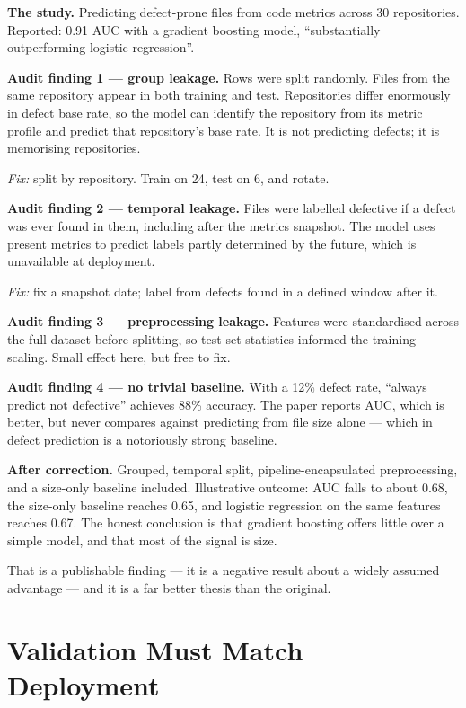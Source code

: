 \begin{worked}
\textbf{The study.} Predicting defect-prone files from code metrics across 30
repositories. Reported: 0.91 AUC with a gradient boosting model, ``substantially
outperforming logistic regression''.

\medskip
\textbf{Audit finding 1 --- group leakage.} Rows were split randomly. Files from
the same repository appear in both training and test. Repositories differ
enormously in defect base rate, so the model can identify the repository from
its metric profile and predict that repository's base rate. It is not
predicting defects; it is memorising repositories.

\emph{Fix:} split by repository. Train on 24, test on 6, and rotate.

\medskip
\textbf{Audit finding 2 --- temporal leakage.} Files were labelled defective if
a defect was ever found in them, including after the metrics snapshot. The
model uses present metrics to predict labels partly determined by the future,
which is unavailable at deployment.

\emph{Fix:} fix a snapshot date; label from defects found in a defined window
after it.

\medskip
\textbf{Audit finding 3 --- preprocessing leakage.} Features were standardised
across the full dataset before splitting, so test-set statistics informed the
training scaling. Small effect here, but free to fix.

\medskip
\textbf{Audit finding 4 --- no trivial baseline.} With a 12\% defect rate,
``always predict not defective'' achieves 88\% accuracy. The paper reports AUC,
which is better, but never compares against predicting from file size alone ---
which in defect prediction is a notoriously strong baseline.

\medskip
\textbf{After correction.} Grouped, temporal split, pipeline-encapsulated
preprocessing, and a size-only baseline included. Illustrative outcome: AUC
falls to about 0.68, the size-only baseline reaches 0.65, and logistic
regression on the same features reaches 0.67. The honest conclusion is that
gradient boosting offers little over a simple model, and that most of the
signal is size.

\medskip
That is a publishable finding --- it is a negative result about a widely
assumed advantage --- and it is a far better thesis than the original.
\end{worked}

\section{Validation Must Match Deployment}

